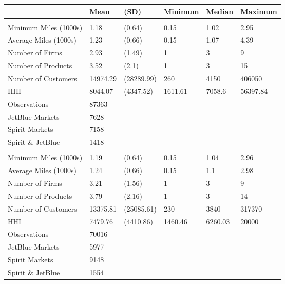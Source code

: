 
\begin{tabular}[t]{llllll}
\toprule
 & Mean & (SD) & Minimum & Median & Maximum\\
\midrule
\addlinespace[0.3em]
\multicolumn{6}{l}{\textbf{Pre-Pandemic}}\\
\hspace{1em}Minimum Miles (1000s) & 1.18 & (0.64) & 0.15 & 1.02 & 2.95\\
\hspace{1em}Average Miles (1000s) & 1.23 & (0.66) & 0.15 & 1.07 & 4.39\\
\hspace{1em}Number of Firms & 2.93 & (1.49) & 1 & 3 & 9\\
\hspace{1em}Number of Products & 3.52 & (2.1) & 1 & 3 & 15\\
\hspace{1em}Number of Customers & 14974.29 & (28289.99) & 260 & 4150 & 406050\\
\hspace{1em}HHI & 8044.07 & (4347.52) & 1611.61 & 7058.6 & 56397.84\\
\midrule
\hspace{1em}Observations & 87363 &  &  &  & \\
\hspace{1em}JetBlue Markets & 7628 &  &  &  & \\
\hspace{1em}Spirit Markets & 7158 &  &  &  & \\
\hspace{1em}Spirit \& JetBlue & 1418 &  &  &  & \\
\midrule
\addlinespace[0.3em]
\multicolumn{6}{l}{\textbf{Post-Pandemic}}\\
\hspace{1em}Minimum Miles (1000s) & 1.19 & (0.64) & 0.15 & 1.04 & 2.96\\
\hspace{1em}Average Miles (1000s) & 1.24 & (0.66) & 0.15 & 1.1 & 2.98\\
\hspace{1em}Number of Firms & 3.21 & (1.56) & 1 & 3 & 9\\
\hspace{1em}Number of Products & 3.79 & (2.16) & 1 & 3 & 14\\
\hspace{1em}Number of Customers & 13375.81 & (25085.61) & 230 & 3840 & 317370\\
\hspace{1em}HHI & 7479.76 & (4410.86) & 1460.46 & 6260.03 & 20000\\
\midrule
\hspace{1em}Observations & 70016 &  &  &  & \\
\hspace{1em}JetBlue Markets & 5977 &  &  &  & \\
\hspace{1em}Spirit Markets & 9148 &  &  &  & \\
\hspace{1em}Spirit \& JetBlue & 1554 &  &  &  & \\
\bottomrule
\end{tabular}
